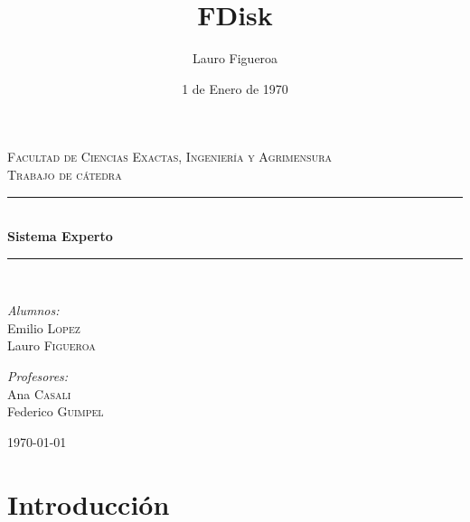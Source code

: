 \documentclass[11pt,oneside,a4paper]{article}
\title{FDisk}
\author{Lauro Figueroa}
\date{1 de Enero de 1970}
\newcommand{\HRule}{\rule{\linewidth}{0.5mm}}
\begin{document}
 
\begin{titlepage}
\begin{center}


\textsc{\LARGE Facultad de Ciencias Exactas, Ingeniería y Agrimensura}\\[1.5cm]
	
\textsc{\Large Trabajo de cátedra}\\[0.5cm]

\HRule \\[0.4cm]
{ \huge \bfseries Sistema Experto \\[0.4cm] }

\HRule \\[1.5cm]

\noindent
\begin{minipage}{0.4\textwidth}
\begin{flushleft} \large
\emph{Alumnos:}\\
Emilio \textsc{Lopez}\\
Lauro \textsc{Figueroa}
\end{flushleft}
\end{minipage}%
\begin{minipage}{0.4\textwidth}
\begin{flushright} \large
\emph{Profesores:} \\
Ana \textsc{Casali}\\
Federico \textsc{Guimpel}\\
\end{flushright}
\end{minipage}

\vfill

{\large \today}

\end{center}
\end{titlepage}

\newpage 

\section*{Introducción}
\end{document}
